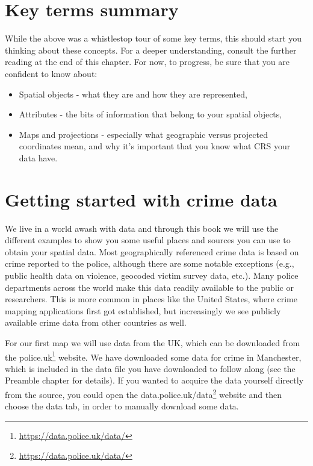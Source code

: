 \documentclass[
]{book}
\providecommand{\tightlist}{%
  \setlength{\itemsep}{0pt}\setlength{\parskip}{0pt}}
\renewcommand{\href}[2]{#2\footnote{\url{#1}}}
\begin{document}
\hypertarget{key-terms-summary}{%
\section{Key terms summary}\label{key-terms-summary}}

While the above was a whistlestop tour of some key terms, this should start you thinking about these concepts. For a deeper understanding, consult the further reading at the end of this chapter. For now, to progress, be sure that you are confident to know about:

\begin{itemize}
\tightlist
\item
  Spatial objects - what they are and how they are represented,
\item
  Attributes - the bits of information that belong to your spatial objects,
\item
  Maps and projections - especially what geographic versus projected coordinates mean, and why it's important that you know what CRS your data have.
\end{itemize}

\hypertarget{getting-started-with-crime-data}{%
\section{Getting started with crime data}\label{getting-started-with-crime-data}}

We live in a world awash with data and through this book we will use the different examples to show you some useful places and sources you can use to obtain your spatial data. Most geographically referenced crime data is based on crime reported to the police, although there are some notable exceptions (e.g., public health data on violence, geocoded victim survey data, etc.). Many police departments across the world make this data readily available to the public or researchers. This is more common in places like the United States, where crime mapping applications first got established, but increasingly we see publicly available crime data from other countries as well.

For our first map we will use data from the UK, which can be downloaded from the \href{https://data.police.uk/data/}{police.uk} website. We have downloaded some data for crime in Manchester, which is included in the data file you have downloaded to follow along (see the Preamble chapter for details). If you wanted to acquire the data yourself directly from the source, you could open the \href{https://data.police.uk/data/}{data.police.uk/data} website and then choose the data tab, in order to manually download some data.
\end{document}
